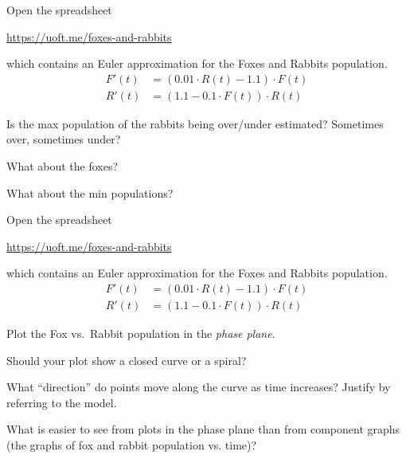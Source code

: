 \documentclass{workbook}
\begin{document}
\begin{slide}
	\question
	Open the spreadsheet

	\url{https://uoft.me/foxes-and-rabbits}

	which contains an Euler approximation for the Foxes and Rabbits population.
	\begin{align*}
		F'(t) &= (0.01\cdot R(t) - 1.1)\cdot F(t)\\
		R'(t) &= (1.1 - 0.1\cdot F(t))\cdot R(t)
	\end{align*}

	\begin{parts}
		\item Is the max population of the rabbits being over/under estimated? Sometimes over, sometimes under?
		\item What about the foxes?
		\item What about the min populations?
	\end{parts}
\end{slide}

\begin{slide}
	\question
	Open the spreadsheet

	\url{https://uoft.me/foxes-and-rabbits}

	which contains an Euler approximation for the Foxes and Rabbits population.
	\begin{align*}
		F'(t) &= (0.01\cdot R(t) - 1.1)\cdot F(t)\\
		R'(t) &= (1.1 - 0.1\cdot F(t))\cdot R(t)
	\end{align*}


	\begin{parts}
		\item Plot the Fox vs.~Rabbit population in the \emph{phase plane}. 
		\item Should your plot show a closed curve or a spiral?
		\item What ``direction'' do points move along the curve as time increases? Justify by referring to the model.
		\item What is easier to see from plots in the phase plane than from component graphs (the graphs of
		fox and rabbit population vs. time)?
	\end{parts}
\end{slide}
\end{document}
